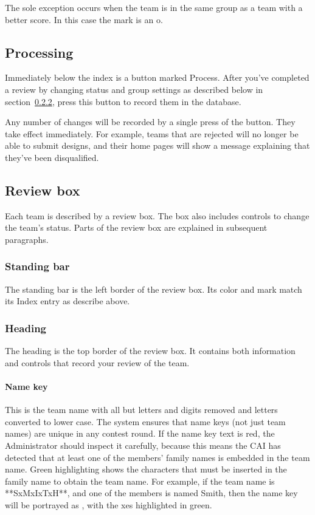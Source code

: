 \documentclass[11pt,letterpaper]{refart}
\def\ui#1{\textsf{#1}}
\begin{document}
The sole exception occurs when the team is in the same group as a team
with a better score. In this case the mark is an \ui{o}.

\subsection{Processing}
Immediately below the index is a button marked \ui{Process}. After
you've completed a review by changing status and group settings as
described below in section~\ref{sec:heading}, press this button to
record them in the database.

Any number of changes will be recorded by a single press of the
button.  They take effect immediately. For example, teams that are
rejected will no longer be able to submit designs, and their home
pages will show a message explaining that they've been disqualified.

\subsection{Review box}
\label{sec:review_boxes}
Each team is described by a review box. The box also includes controls
to change the team's status. Parts of the review box are explained in
subsequent paragraphs.

\subsubsection{Standing bar}
The standing bar is the left border of the review box. Its color and
mark match its Index entry as describe above.

\subsubsection{Heading}
\label{sec:heading}
The heading is the top border of the review box. It contains both
information and controls that record your review of the team.

\paragraph{Name key}
This is the team name with all but letters and digits removed and
letters converted to lower case. The system ensures that name keys
(not just team names) are unique in any contest round. If the name key
text is red, the Administrator should inspect it carefully, because
this means the CAI has detected that at least one of the members'
family names is embedded in the team name. Green highlighting shows
the characters that must be inserted in the family name to obtain the
team name. For example, if the team name is \ui{**SxMxIxTxH**}, and
one of the members is named Smith, then the name key will be portrayed
as \ui{\color{red}{sxmxixtxh}}, with the \ui{x}es highlighted in
green.
\end{document}

